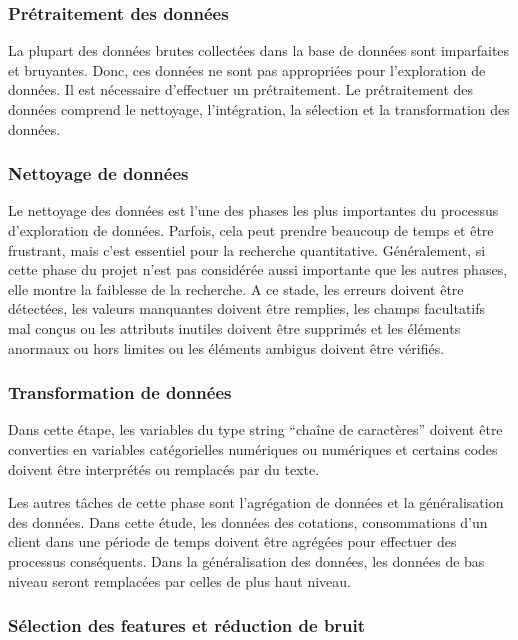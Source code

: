 \documentclass[12pt]{article}
\begin{document}
{\subsubsection{Prétraitement des données}

La plupart des données brutes collectées dans la base de données sont imparfaites et bruyantes. Donc, ces données ne sont pas appropriées pour l'exploration de données. Il est nécessaire d'effectuer un prétraitement.
Le prétraitement des données comprend le nettoyage, l'intégration, la sélection et la transformation des données.

\subsubsection{Nettoyage de données}

Le nettoyage des données est l'une des phases les plus importantes du processus d'exploration de données. Parfois, cela peut prendre beaucoup de temps et être frustrant, mais c'est essentiel pour la recherche quantitative. 
Généralement, si cette phase du projet n'est pas considérée aussi importante que les autres phases, elle montre la faiblesse de la recherche. A ce stade, les erreurs doivent être détectées, les valeurs manquantes doivent être remplies, les champs facultatifs mal conçus ou les attributs inutiles doivent être supprimés et les éléments anormaux ou hors limites ou les éléments ambigus doivent être vérifiés.

\subsubsection{Transformation de données}

Dans cette étape, les variables du type string “chaîne de caractères” doivent être converties en variables catégorielles numériques ou numériques et certains codes doivent être interprétés ou remplacés par du texte. 

Les autres tâches de cette phase sont l'agrégation de données et la généralisation des données. Dans cette étude, les données des cotations, consommations  d'un client dans une période de temps doivent être agrégées pour effectuer des processus conséquents. 
Dans la généralisation des données, les données de bas niveau seront remplacées par celles de plus haut niveau.

\subsubsection{Sélection des features et réduction de bruit}

}
\end{document}
